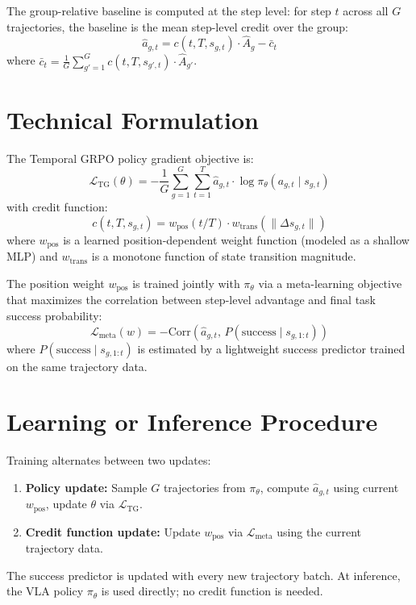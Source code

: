 \documentclass[10pt,twocolumn]{article}
\begin{document}
The group-relative baseline is computed at the step level: for step $t$ across
all $G$ trajectories, the baseline is the mean step-level credit over the group:
\[
  \hat{a}_{g,t} = c(t, T, s_{g,t}) \cdot \hat{A}_g - \bar{c}_t
\]
where $\bar{c}_t = \frac{1}{G}\sum_{g'=1}^G c(t, T, s_{g',t}) \cdot \hat{A}_{g'}$.

\section{Technical Formulation}

The Temporal GRPO policy gradient objective is:
\[
  \mathcal{L}_{\text{TG}}(\theta) = -\frac{1}{G}\sum_{g=1}^G \sum_{t=1}^T
  \hat{a}_{g,t} \cdot \log \pi_\theta(a_{g,t} \mid s_{g,t})
\]
with credit function:
\[
  c(t, T, s_{g,t}) = w_{\text{pos}}(t/T) \cdot w_{\text{trans}}(\|\Delta s_{g,t}\|)
\]
where $w_{\text{pos}}$ is a learned position-dependent weight function (modeled
as a shallow MLP) and $w_{\text{trans}}$ is a monotone function of state
transition magnitude.

The position weight $w_{\text{pos}}$ is trained jointly with $\pi_\theta$ via
a meta-learning objective that maximizes the correlation between step-level
advantage and final task success probability:
\[
  \mathcal{L}_{\text{meta}}(w) = -\text{Corr}\left(\hat{a}_{g,t},\,
  P(\text{success} \mid s_{g,1:t})\right)
\]
where $P(\text{success} \mid s_{g,1:t})$ is estimated by a lightweight success
predictor trained on the same trajectory data.

\section{Learning or Inference Procedure}

Training alternates between two updates:
\begin{enumerate}[itemsep=2pt,parsep=0pt]
  \item \textbf{Policy update:} Sample $G$ trajectories from $\pi_\theta$,
    compute $\hat{a}_{g,t}$ using current $w_{\text{pos}}$, update $\theta$
    via $\mathcal{L}_{\text{TG}}$.
  \item \textbf{Credit function update:} Update $w_{\text{pos}}$ via
    $\mathcal{L}_{\text{meta}}$ using the current trajectory data.
\end{enumerate}
The success predictor is updated with every new trajectory batch. At inference,
the VLA policy $\pi_\theta$ is used directly; no credit function is needed.
\end{document}
